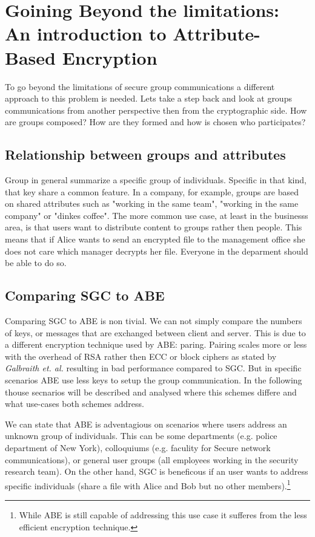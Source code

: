 \section{Goining Beyond the limitations: An introduction to Attribute-Based Encryption}

To go beyond the limitations of secure group communications a different approach to this problem is needed. Lets take a step back and look at groups communications from another perspective then from the cryptographic side. How are groups composed? How are they formed and how is chosen who participates? 

\subsection{Relationship between groups and attributes}
Group in general summarize a specific group of individuals. Specific in that kind, that key share a common feature. In a company, for example, groups are based on shared attributes such as "working in the same team", "working in the same company" or "dinkes coffee". The more common use case, at least in the businesss area, is that users want to distribute content to groups rather then people. This means that if Alice wants to send an encrypted file to the management office she does not care which manager decrypts her file. Everyone in the deparment should be able to do so. 

\subsection{Comparing SGC to ABE}

Comparing SGC to ABE is non tivial. We can not simply compare the numbers of keys, or messages that are exchanged between client and server. This is due to a different encryption technique used by ABE: paring. Pairing scales more or less with the overhead of RSA rather then ECC or block ciphers as stated by \textit{Galbraith et. al.} \cite{galbraith2008pairings} resulting in bad performance compared to SGC.  But in specific scenarios ABE use less keys to setup the group communication. In the following thouse secnarios will be described and analysed where this schemes differe and what use-cases both schemes address.

We can state that ABE is adventagious on scenarios where users address an unknown group of individuals. This can be some departments (e.g. police department of New York), colloquiums (e.g. faculity for Secure network communications), or general user groups (all employees working in the security research team). On the other hand, SGC is beneficous if an user wants to address specific individuals (share a file with Alice and Bob but no other members).\footnote{While ABE is still capable of addressing this use case it sufferes from the less efficient encryption technique.}

